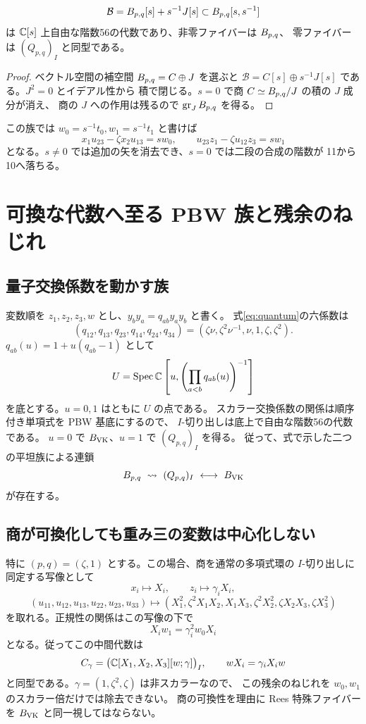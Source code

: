 \begin{proposition}\label{prop:rees}
\[
 \mathcal B=B_{p,q}[s]+s^{-1}J[s]\subset B_{p,q}[s,s^{-1}]
\]
は $\mathbb C[s]$ 上自由な階数56の代数であり、非零ファイバーは $B_{p,q}$、
零ファイバーは $(Q_{p,q})_I$ と同型である。
\end{proposition}
\begin{proof}
ベクトル空間の補空間 $B_{p,q}=C\oplus J$ を選ぶと
$\mathcal B=C[s]\oplus s^{-1}J[s]$ である。$J^2=0$ とイデアル性から
積で閉じる。$s=0$ で商 $C\simeq B_{p,q}/J$ の積の $J$ 成分が消え、
商の $J$ への作用は残るので $\operatorname{gr}_JB_{p,q}$ を得る。
\end{proof}

この族では $w_0=s^{-1}t_0,w_1=s^{-1}t_1$ と書けば
\[
 x_1u_{23}-\zeta x_2u_{13}=s w_0,\qquad
 u_{23}z_1-\zeta u_{12}z_3=s w_1
\]
となる。$s\ne0$ では追加の矢を消去でき、$s=0$ では二段の合成の階数が
11から10へ落ちる。

\section{可換な代数へ至る PBW 族と残余のねじれ}\label{sec:pbw}
\subsection{量子交換係数を動かす族}
変数順を $z_1,z_2,z_3,w$ とし、$y_b y_a=q_{ab}y_a y_b$ と書く。
式\eqref{eq:quantum}の六係数は
\[
 (q_{12},q_{13},q_{23},q_{14},q_{24},q_{34})
 =(\zeta\nu,\zeta^2\nu^{-1},\nu,1,\zeta,\zeta^2).
\]
$q_{ab}(u)=1+u(q_{ab}-1)$ として
\[
 U=\operatorname{Spec}\mathbb C\left[u,\left(\prod_{a<b}q_{ab}(u)\right)^{-1}\right]
\]
を底とする。$u=0,1$ はともに $U$ の点である。
スカラー交換係数の関係は順序付き単項式を PBW 基底にするので、
$I$-切り出しは底上で自由な階数56の代数である。
$u=0$ で $B_{\mathrm{VK}}$、$u=1$ で $(Q_{p,q})_I$ を得る。
従って、式で示した二つの平坦族による連鎖
\[
 \Blo\ \rightsquigarrow\ (Q_{p,q})_I\ \longleftrightarrow\ \B
\]
が存在する。

\subsection{商が可換化しても重み三の変数は中心化しない}
特に $(p,q)=(\zeta,1)$ とする。この場合、商を通常の多項式環の
$I$-切り出しに同定する写像として
\[
 x_i\longmapsto X_i,\qquad z_i\longmapsto\gamma_i X_i,
\]
\[
 (u_{11},u_{12},u_{13},u_{22},u_{23},u_{33})\longmapsto
 (X_1^2,\zeta^2X_1X_2,X_1X_3,
 \zeta^2X_2^2,\zeta X_2X_3,\zeta X_3^2)
\]
を取れる。正規性の関係はこの写像の下で
\[
 X_iw_1=\gamma_i^2w_0X_i
\]
となる。従ってこの中間代数は
\begin{equation}\label{eq:ore}
 C_\gamma=
 \bigl(\mathbb C[X_1,X_2,X_3][w;\gamma]\bigr)_I,
 \qquad wX_i=\gamma_iX_iw
\end{equation}
と同型である。$\gamma=(1,\zeta^2,\zeta)$ は非スカラーなので、
この残余のねじれを $w_0,w_1$ のスカラー倍だけでは除去できない。
商の可換性を理由に Rees 特殊ファイバーを $B_{\mathrm{VK}}$ と同一視してはならない。


